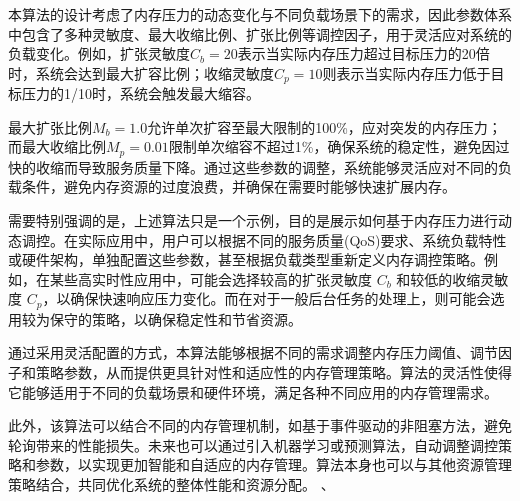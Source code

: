 本算法的设计考虑了内存压力的动态变化与不同负载场景下的需求，因此参数体系中包含了多种灵敏度、最大收缩比例、扩张比例等调控因子，用于灵活应对系统的负载变化。例如，扩张灵敏度\(C_b = 20\)表示当实际内存压力超过目标压力的20倍时，系统会达到最大扩容比例；收缩灵敏度\(C_p = 10\)则表示当实际内存压力低于目标压力的1/10时，系统会触发最大缩容。

最大扩张比例\(M_b = 1.0\)允许单次扩容至最大限制的100\%，应对突发的内存压力；而最大收缩比例\(M_p = 0.01\)限制单次缩容不超过1\%，确保系统的稳定性，避免因过快的收缩而导致服务质量下降。通过这些参数的调整，系统能够灵活应对不同的负载条件，避免内存资源的过度浪费，并确保在需要时能够快速扩展内存。


需要特别强调的是，上述算法只是一个示例，目的是展示如何基于内存压力进行动态调控。在实际应用中，用户可以根据不同的服务质量(QoS)要求、系统负载特性或硬件架构，单独配置这些参数，甚至根据负载类型重新定义内存调控策略。例如，在某些高实时性应用中，可能会选择较高的扩张灵敏度 \(C_b\) 和较低的收缩灵敏度 \(C_p\)，以确保快速响应压力变化。而在对于一般后台任务的处理上，则可能会选用较为保守的策略，以确保稳定性和节省资源。

通过采用灵活配置的方式，本算法能够根据不同的需求调整内存压力阈值、调节因子和策略参数，从而提供更具针对性和适应性的内存管理策略。算法的灵活性使得它能够适用于不同的负载场景和硬件环境，满足各种不同应用的内存管理需求。

此外，该算法可以结合不同的内存管理机制，如基于事件驱动的非阻塞方法，避免轮询带来的性能损失。未来也可以通过引入机器学习或预测算法，自动调整调控策略和参数，以实现更加智能和自适应的内存管理。算法本身也可以与其他资源管理策略结合，共同优化系统的整体性能和资源分配。
、





